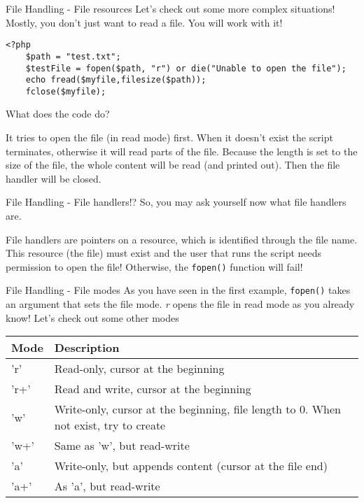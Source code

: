 \begin{frame}[fragile]{File Handling - File resources}
	Let's check out some more complex situations! Mostly, you don't just want to read a file. You will work with it!\pause
	
	\begin{lstlisting}
<?php
    $path = "test.txt";
	$testFile = fopen($path, "r") or die("Unable to open the file");
	echo fread($myfile,filesize($path));
	fclose($myfile);
	\end{lstlisting}\pause
	What does the code do?\pause
	
	It tries to open the file (in read mode) first. When it doesn't exist the script terminates, otherwise it will read parts of the file. Because the length is set to the size of the file, the whole content will be read (and printed out). Then the file handler will be closed. \pause


\end{frame}

\begin{frame}[fragile]{File Handling - File handlers!?}
	So, you may ask yourself now what file handlers are.\pause
	
	File handlers are pointers on a resource, which is identified through the file name. This resource (the file) must exist and the user that runs the script needs permission to open the file! Otherwise, the \texttt{fopen()} function will fail!\pause
	
	
\end{frame}

\begin{frame}[fragile]{File Handling - File modes}
	As you have seen in the first example, \texttt{fopen()} takes an argument that sets the file mode. \textit{r} opens the file in read mode as you already know! Let's check out some other modes\pause
	
	\begin{tabular}{p{0.75cm} | p{10cm}}
		Mode & Description \\
		\hline \pause
		'r' & \pause Read-only, cursor at the beginning \pause \\
		\hline \pause
		'r+' & \pause Read and write, cursor at the beginning \pause \\
		\hline \pause
		'w' & \pause Write-only, cursor at the beginning, file length to 0. When not exist, try to create \pause\\
		\hline \pause
		'w+' & \pause Same as 'w', but read-write \pause \\
		\hline \pause
		'a' & \pause Write-only, but appends content (cursor at the file end)  \pause \\
		\hline \pause
		'a+' & \pause As 'a', but read-write \\
		\hline
	\end{tabular}
	
\end{frame}


